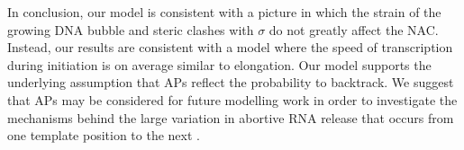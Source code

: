 In conclusion, our model is consistent with a picture in which the strain of
the growing DNA bubble and steric clashes with $\sigma$ do not greatly affect
the NAC. Instead, our results are consistent with a model where the speed of
transcription during initiation is on average similar to elongation. Our model
supports the underlying assumption that APs reflect the probability to
backtrack. We suggest that APs may be considered for future modelling work in
order to investigate the mechanisms behind the large variation in abortive RNA
release that occurs from one template position to the next
\cite{hsu_initial_2006}.
